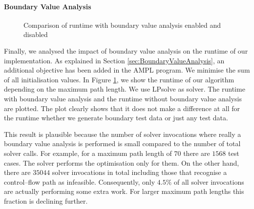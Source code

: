 \documentclass[runningheads,a4paper]{llncs}%
\begin{document}
\paragraph{Boundary Value Analysis}
\label{sec:caseStudyBoundaryValues}
\begin{figure}
\begin{center}
%
\end{center}%
\caption{Comparison of runtime with boundary value analysis enabled and disabled}%
\label{fig:RuntimeBoundaryValue}%
\end{figure}%
Finally, we analysed the impact of boundary value analysis on the runtime of our implementation. As explained in Section \ref{sec:BoundaryValueAnalysis}, an additional objective has been added in the AMPL program. We minimise the sum of all initialisation values. In Figure \ref{fig:RuntimeBoundaryValue}, we show the runtime of our algorithm depending on the maximum path length. We use LPsolve as solver. The runtime with boundary value analysis and the runtime without boundary value analysis are plotted. The plot clearly shows that it does not make a difference at all for the runtime whether we generate boundary test data or just any test data.

This result is plausible because the number of solver invocations where really a boundary value analysis is performed is small compared to the number of total solver calls. For example, for a maximum path length of $70$ there are $1568$ test cases. The solver performs the optimisation only for them. On the other hand, there are $35044$ solver invocations in total including those that recognise a control--flow path as infeasible. Consequently, only $4.5\%$ of all solver invocations are actually performing some extra work. For larger maximum path lengths this fraction is declining further.
\end{document}
